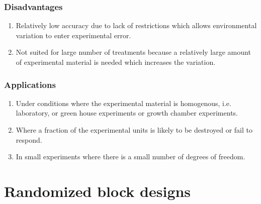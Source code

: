 \documentclass[oneside,11pt,pdftex]{book}%
\numberwithin{equation}{section}
\numberwithin{section}{chapter}
\numberwithin{equation}{chapter}
\begin{document}
\subsubsection{Disadvantages}
\begin{enumerate}
	\item Relatively low accuracy due to lack of restrictions which allows environmental variation to enter experimental error.
	\item Not suited for large number of treatments because a relatively large amount of experimental material is needed which increases the variation.
\end{enumerate}
\subsubsection{Applications}
\begin{enumerate}
	\item Under conditions where the experimental material is homogenous, i.e. laboratory, or green house experiments or growth chamber experiments.
	\item Where a fraction of the experimental units is likely to be destroyed or fail to respond.
	\item In small experiments where there is a small number of degrees of freedom.
\end{enumerate}

\section{Randomized block designs}
\end{document}

